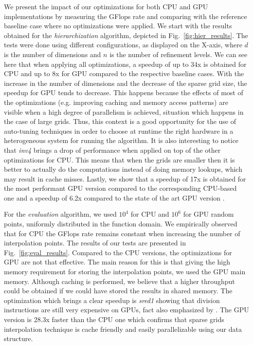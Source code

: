 We present the impact of our optimizations for both CPU and GPU implementations
by measuring the GFlops rate and comparing with the reference baseline case
where no optimizations were applied. We start with the results obtained for the
\textit{hierarchization} algorithm, depicted in Fig.~\ref{fig:hier_results}. The
tests were done using different configurations, as displayed on the X-axis,
where $d$ is the number of dimensions and $n$ is the number of refinement
levels. We can see here that when applying all optimizations, a speedup of up to
34x is obtained for CPU and up to 8x for GPU compared to the respective baseline
cases. With the increase in the number of dimensions and the decrease of the
sparse grid size, the speedup for GPU tends to decrease. This happens because
the effects of most of the optimizations (e.g. improving caching and memory
access patterns) are visible when a high degree of parallelism is achieved,
situation which happens in the case of large grids. Thus, this context is a good
opportunity for the use of auto-tuning techniques in order to choose at runtime
the right hardware in a heterogeneous system for running the algorithm. It is
also interesting to notice that \textit{inv4} brings a drop of performance when
applied on top of the other optimizations for CPU. This means that when the
grids are smaller then it is better to actually do the computations instead of
doing memory lookups, which may result in cache misses. Lastly, we show that a
speedup of 17x is obtained for the most performant GPU version compared to the
corresponding CPU-based one and a speedup of 6.2x compared to the state of the
art GPU version \cite{Murarasu:2011:CDS:1941553.1941559}.


For the \textit{evaluation} algorithm, we used $10^{4}$ for CPU and $10^{6}$
for GPU random points, uniformly distributed in the function domain. We
empirically observed that for CPU the GFlops rate remains constant when
increasing the number of interpolation points. The results of our tests are
presented in Fig.~\ref{fig:eval_results}. Compared to the CPU versions, the
optimizations for GPU are not that effective. The main reason for this is that
giving the high memory requirement for storing the interpolation points, we used
the GPU main memory. Although caching is performed, we believe that a higher
throughput could be obtained if we could have stored the results in shared
memory. The optimization which brings a clear speedup is \textit{sred1} showing
that division instructions are still very expensive on GPUs, fact also
emphasized by \cite{cuda}. The GPU version is 28.3x faster than the CPU
one which confirms that sparse grids interpolation technique is cache friendly
and easily parallelizable using our data structure.

